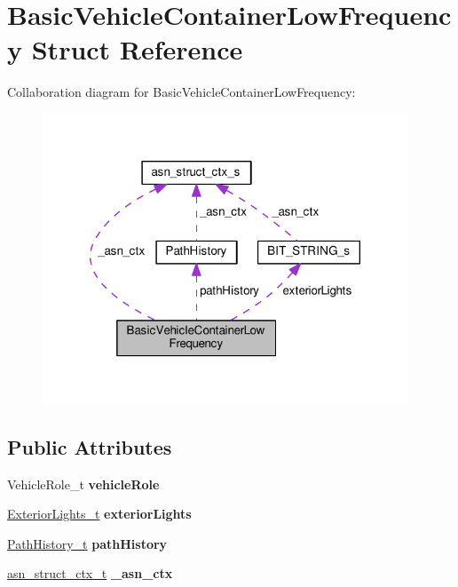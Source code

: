 \hypertarget{structBasicVehicleContainerLowFrequency}{}\section{Basic\+Vehicle\+Container\+Low\+Frequency Struct Reference}
\label{structBasicVehicleContainerLowFrequency}


Collaboration diagram for Basic\+Vehicle\+Container\+Low\+Frequency\+:\nopagebreak
\begin{figure}[H]
\begin{center}
\leavevmode
\includegraphics[width=308pt]{structBasicVehicleContainerLowFrequency__coll__graph}
\end{center}
\end{figure}
\subsection*{Public Attributes}
\begin{DoxyCompactItemize}
\item 
Vehicle\+Role\+\_\+t {\bfseries vehicle\+Role}\hypertarget{structBasicVehicleContainerLowFrequency_ab6fbbd2f872985220090a8fd0100925b}{}\label{structBasicVehicleContainerLowFrequency_ab6fbbd2f872985220090a8fd0100925b}

\item 
\hyperlink{structBIT__STRING__s}{Exterior\+Lights\+\_\+t} {\bfseries exterior\+Lights}\hypertarget{structBasicVehicleContainerLowFrequency_a1060a051709e86bc2d7af700b18a2591}{}\label{structBasicVehicleContainerLowFrequency_a1060a051709e86bc2d7af700b18a2591}

\item 
\hyperlink{structPathHistory}{Path\+History\+\_\+t} {\bfseries path\+History}\hypertarget{structBasicVehicleContainerLowFrequency_aa4c575d2af16af6995abf77f02c8d4c8}{}\label{structBasicVehicleContainerLowFrequency_aa4c575d2af16af6995abf77f02c8d4c8}

\item 
\hyperlink{structasn__struct__ctx__s}{asn\+\_\+struct\+\_\+ctx\+\_\+t} {\bfseries \+\_\+asn\+\_\+ctx}\hypertarget{structBasicVehicleContainerLowFrequency_a99dd00d9ea0dc6240914337704f30101}{}\label{structBasicVehicleContainerLowFrequency_a99dd00d9ea0dc6240914337704f30101}

\end{DoxyCompactItemize}


